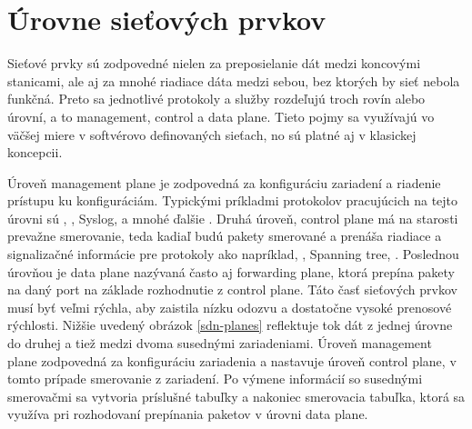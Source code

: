 \section{Úrovne sieťových prvkov}
Sieťové prvky sú zodpovedné nielen za preposielanie dát medzi koncovými stanicami, ale aj za mnohé riadiace dáta medzi sebou, bez ktorých by sieť nebola funkčná. Preto sa jednotlivé protokoly a služby rozdeľujú troch rovín alebo úrovní, a to management, control a data plane. Tieto pojmy sa využívajú vo väčšej miere v softvérovo definovaných sieťach, no sú platné aj v klasickej koncepcii.
 
Úroveň management plane je zodpovedná za konfiguráciu zariadení a riadenie prístupu ku konfiguráciám. Typickými príkladmi protokolov pracujúcich na tejto úrovni sú , , Syslog,  a mnohé ďalšie \cite{Singh2018}. Druhá úroveň, control plane má na starosti prevažne smerovanie, teda kadiaľ budú pakety smerované a prenáša riadiace a signalizačné informácie pre protokoly ako napríklad, , Spanning tree,  \cite{Singh2018}. Poslednou úrovňou je data plane nazývaná často aj forwarding plane, ktorá prepína pakety na daný port na základe rozhodnutie z control plane. Táto časť sieťových prvkov musí byť veľmi rýchla, aby zaistila nízku odozvu a dostatočne vysoké prenosové rýchlosti. Nižšie uvedený obrázok \ref{sdn-planes} reflektuje tok dát z jednej úrovne do druhej a tiež medzi dvoma susednými zariadeniami. Úroveň management plane zodpovedná za konfiguráciu zariadenia a nastavuje úroveň control plane, v tomto prípade smerovanie z zariadení. Po výmene informácií so susednými smerovačmi sa vytvoria príslušné tabuľky a nakoniec smerovacia tabuľka, ktorá sa využíva pri rozhodovaní prepínania paketov v úrovni data plane.

